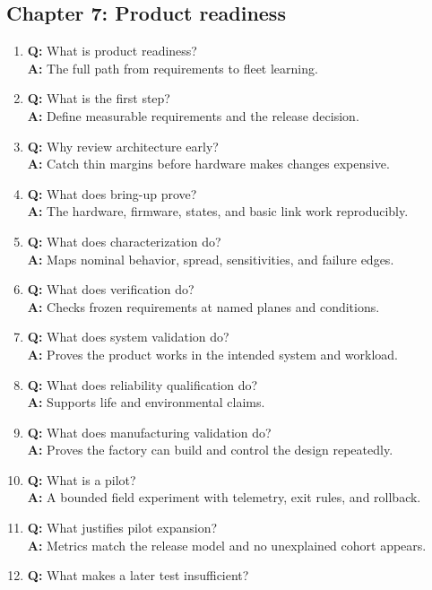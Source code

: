 \subsection{Chapter 7: Product readiness}
\begin{enumerate}
\item \textbf{Q:} What is product readiness?\\
\textbf{A:} The full path from requirements to fleet learning.
\item \textbf{Q:} What is the first step?\\
\textbf{A:} Define measurable requirements and the release decision.
\item \textbf{Q:} Why review architecture early?\\
\textbf{A:} Catch thin margins before hardware makes changes expensive.
\item \textbf{Q:} What does bring-up prove?\\
\textbf{A:} The hardware, firmware, states, and basic link work reproducibly.
\item \textbf{Q:} What does characterization do?\\
\textbf{A:} Maps nominal behavior, spread, sensitivities, and failure edges.
\item \textbf{Q:} What does verification do?\\
\textbf{A:} Checks frozen requirements at named planes and conditions.
\item \textbf{Q:} What does system validation do?\\
\textbf{A:} Proves the product works in the intended system and workload.
\item \textbf{Q:} What does reliability qualification do?\\
\textbf{A:} Supports life and environmental claims.
\item \textbf{Q:} What does manufacturing validation do?\\
\textbf{A:} Proves the factory can build and control the design repeatedly.
\item \textbf{Q:} What is a pilot?\\
\textbf{A:} A bounded field experiment with telemetry, exit rules, and rollback.
\item \textbf{Q:} What justifies pilot expansion?\\
\textbf{A:} Metrics match the release model and no unexplained cohort appears.
\item \textbf{Q:} What makes a later test insufficient?\\

\end{enumerate}
